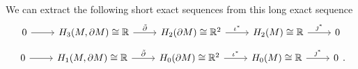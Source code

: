 \documentclass{article}
\begin{document}
We can extract the following short exact sequences from this long exact sequence
\[
\begin{tikzcd}
0 \arrow[r] & {H_3(M,\partial M)\cong \mathbb{R}} \arrow[r, "\tilde{\partial}"] & H_2(\partial M)\cong \mathbb{R}^2 \arrow[r, "\iota^*"] & H_2(M)\cong \mathbb{R} \arrow[r, "\jmath^*"] & 0
\end{tikzcd}
\]
\[
\begin{tikzcd}
0 \arrow[r] & {H_1(M,\partial M)\cong \mathbb{R}} \arrow[r, "\tilde{\partial}"] & H_0(\partial M)\cong \mathbb{R}^2 \arrow[r, "\iota^*"] & H_0(M)\cong \mathbb{R} \arrow[r, "\jmath^*"] & 0
\end{tikzcd}.
\]
\end{document}
